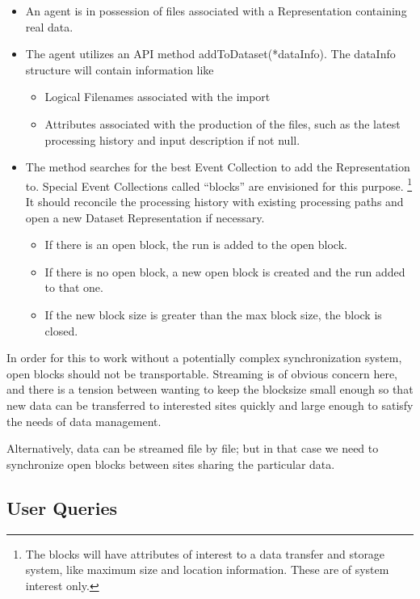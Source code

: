 \documentclass{cmspaper}
\begin{document}
\begin{itemize}
\item An agent is in possession of files associated with a Representation
containing real data.
\item The agent utilizes an API method addToDataset(*dataInfo).  The dataInfo structure 
will contain information like 
\begin{itemize}
\item Logical Filenames associated with the import
\item Attributes associated with the production of the files, such as 
the latest processing history and input description if not null. 
\end{itemize}
\item The method searches for the best Event Collection to add the Representation to.  
Special Event Collections called ``blocks'' are envisioned for this purpose.  
\footnote{The blocks will have attributes of interest to a data transfer and storage 
system, like maximum size and location information. These are of system interest only.}
It should reconcile the processing history with existing processing paths and 
open a new Dataset Representation if necessary.
\begin{itemize}
\item If there is an open block, the run is added to the open block.
\item If there is no open block, a new open block is created and the run added to that one.
\item If the new block size is greater than the max block size, the block is closed.  
\end{itemize}
\end{itemize}

In order for this to work without a potentially complex synchronization system, 
open blocks should not be transportable. Streaming is of obvious concern here, 
and there is a tension between wanting to keep the blocksize small enough so that 
new data can be transferred to interested sites quickly and large enough to satisfy 
the needs of data management.

Alternatively, data can be streamed file by file; but in that case we need to synchronize
open blocks between sites sharing the particular data.

\subsection{User Queries}
\end{document}
